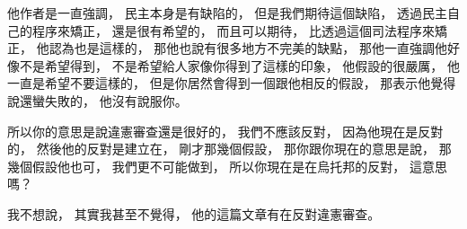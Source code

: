 \hypertarget{w06:cue:3251}{}他作者是一直強調，
\hypertarget{w06:cue:3252}{}民主本身是有缺陷的，
\hypertarget{w06:cue:3253}{}但是我們期待這個缺陷，
\hypertarget{w06:cue:3254}{}透過民主自己的程序來矯正，
\hypertarget{w06:cue:3255}{}還是很有希望的，
\hypertarget{w06:cue:3256}{}而且可以期待，
\hypertarget{w06:cue:3257}{}比透過這個司法程序來矯正，
\hypertarget{w06:cue:3258}{}他認為也是這樣的，
\hypertarget{w06:cue:3259}{}那他也說有很多地方不完美的缺點，
\hypertarget{w06:cue:3260}{}那他一直強調他好像不是希望得到，
\hypertarget{w06:cue:3261}{}不是希望給人家像你得到了這樣的印象，
\hypertarget{w06:cue:3262}{}他假設的很嚴厲，
\hypertarget{w06:cue:3263}{}他一直是希望不要這樣的，
\hypertarget{w06:cue:3264}{}但是你居然會得到一個跟他相反的假設，
\hypertarget{w06:cue:3265}{}那表示他覺得說還蠻失敗的，
\hypertarget{w06:cue:3266}{}他沒有說服你。

\hypertarget{w06:cue:3267}{}所以你的意思是說違憲審查還是很好的，
\hypertarget{w06:cue:3268}{}我們不應該反對，
\hypertarget{w06:cue:3269}{}因為他現在是反對的，
\hypertarget{w06:cue:3270}{}然後他的反對是建立在，
\hypertarget{w06:cue:3271}{}剛才那幾個假設，
\hypertarget{w06:cue:3272}{}那你跟你現在的意思是說，
\hypertarget{w06:cue:3273}{}那幾個假設他也可，
\hypertarget{w06:cue:3274}{}我們更不可能做到，
\hypertarget{w06:cue:3275}{}所以你現在是在烏托邦的反對，
\hypertarget{w06:cue:3276}{}這意思嗎？

\hypertarget{w06:cue:3277}{}我不想說，
\hypertarget{w06:cue:3278}{}其實我甚至不覺得，
\hypertarget{w06:cue:3279}{}他的這篇文章有在反對違憲審查。

